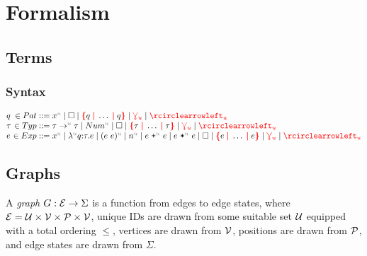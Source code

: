 \section{Formalism}



\subsection{Terms}


\subsubsection{Syntax}

\[
  \arraycolsep=0pt
  \begin{array}{lrlll}
    q & {}\in Pat & {}::={} &
      x^{\id{u}}
      \mid \hole
      \mid \conflictHole{q,\ldots,q}
      \mid \multiVertex{u}
      \mid \cycleVertex{u}
      \\
    \tau & {}\in Typ & {}::={} &
      \tau \rightarrow^{\id{u}} \tau
      \mid Num^{\id{u}}
      \mid \hole
      \mid \conflictHole{\tau,\ldots,\tau}
      \mid \multiVertex{u}
      \mid \cycleVertex{u}
      \\
    e & {}\in Exp & {}::={} &
      x^{\id{u}}
      \mid \lambda^{\id{u}} q \mathord{:}\tau.e
      \mid (e~e)^{\id{u}}
      \mid n^{\id{u}}
      \mid e~\texttt{+}^{\id{u}}~e
      \mid e~\texttt{*}^{\id{u}}~e
      \mid \hole
      \mid \conflictHole{e,\ldots,e}
      \mid \multiVertex{u}
      \mid \cycleVertex{u}
      \\
  \end{array}
\]


\subsection{Graphs}

\begin{definition}
  A \emph{graph} $G : \E \rightarrow \Sigma$ is a function from edges to edge states,
  where $\E = \U \times \V \times \P \times \V$,
  unique IDs are drawn from some suitable set $\U$ equipped with a total ordering $\leq$,
  vertices are drawn from $\V$,
  positions are drawn from $\P$,
  and edge states are drawn from $\Sigma$.
\end{definition}

